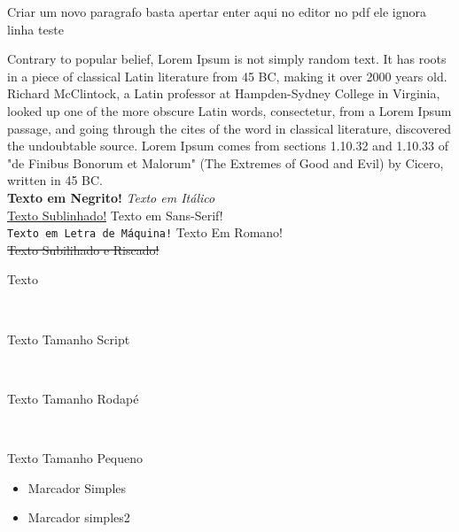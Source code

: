 \documentclass[12pt, a4paper, onside]{article}
\begin{document}
Criar um novo paragrafo basta apertar enter aqui no editor no pdf ele ignora %
 linha
\newline teste

Contrary to popular belief, Lorem Ipsum is not simply random text. It has roots in a piece of classical Latin literature from 45 BC, making it over 2000 years old. Richard McClintock, a Latin professor at Hampden-Sydney College in Virginia, looked up one of the more obscure Latin words, consectetur, from a Lorem Ipsum passage, and going through the cites of the word in classical literature, discovered the undoubtable source. Lorem Ipsum comes from sections 1.10.32 and 1.10.33 of "de Finibus Bonorum et Malorum" (The Extremes of Good and Evil) by Cicero, written in 45 BC. \\

\noindent
\textbf{Texto em Negrito!} \textit{Texto em Itálico}\\
\underline{Texto Sublinhado!} \textsf{Texto em Sans-Serif!}\\
\texttt{Texto em Letra de Máquina!} \textrm{Texto Em Romano!}\\
\sout{Texto Subilihado e Riscado!}\\
\begin{tiny} %
Texto
\end{tiny}\\

\begin{scriptsize}
Texto Tamanho Script
\end{scriptsize}\\

\begin{footnotesize}
Texto Tamanho Rodapé
\end{footnotesize}\\

\begin{small}
Texto Tamanho Pequeno
\end{small}
\begin{itemize}
    \item Marcador Simples
    \item Marcador simples2
\end{itemize}
\end{document}
